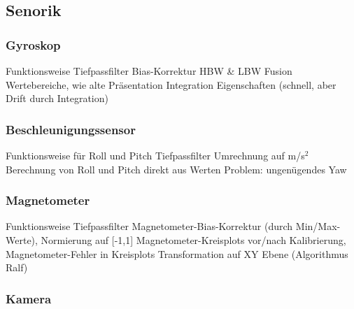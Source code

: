 \subsection{Senorik}
\subsubsection{Gyroskop}
Funktionsweise
Tiefpassfilter
Bias-Korrektur
HBW \& LBW Fusion
Wertebereiche, wie alte Präsentation
Integration
Eigenschaften (schnell, aber Drift durch Integration)
\subsubsection{Beschleunigungssensor}
Funktionsweise
für Roll und Pitch
Tiefpassfilter
Umrechnung auf m/s$^2$
Berechnung von Roll und Pitch direkt aus Werten
Problem: ungenügendes Yaw
\subsubsection{Magnetometer}
Funktionsweise
Tiefpassfilter
Magnetometer-Bias-Korrektur (durch Min/Max-Werte), Normierung auf [-1,1]
Magnetometer-Kreisplots vor/nach Kalibrierung, Magnetometer-Fehler in Kreisplots
Transformation auf XY Ebene (Algorithmus Ralf)
\subsubsection{Kamera}
